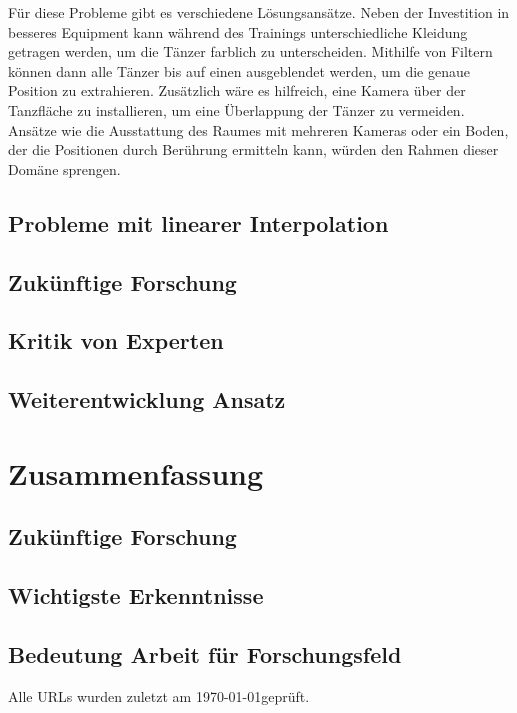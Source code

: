 \documentclass[
  ngerman,
  a4paper,  %
  twoside,  %
  bibliography=totoc,
  headsepline,
  cleardoublepage=empty,
  parskip=half,
  draft=false
]{scrbook}
\begin{document}
Für diese Probleme gibt es verschiedene Lösungsansätze. Neben der Investition in besseres Equipment kann während des Trainings unterschiedliche Kleidung getragen werden, um die Tänzer farblich zu unterscheiden. Mithilfe von Filtern können dann alle Tänzer bis auf einen ausgeblendet werden, um die genaue Position zu extrahieren. Zusätzlich wäre es hilfreich, eine Kamera über der Tanzfläche zu installieren, um eine Überlappung der Tänzer zu vermeiden. Ansätze wie die Ausstattung des Raumes mit mehreren Kameras oder ein Boden, der die Positionen durch Berührung ermitteln kann, würden den Rahmen dieser Domäne sprengen.

\section{Probleme mit linearer Interpolation}
\section{Zukünftige Forschung}
\section{Kritik von Experten}
\section{Weiterentwicklung Ansatz}

\chapter{Zusammenfassung}
\section{Zukünftige Forschung}
\section{Wichtigste Erkenntnisse}
\section{Bedeutung Arbeit für Forschungsfeld}

\printbibliography

Alle URLs wurden zuletzt am \today \space geprüft.

\appendix


\pagestyle{empty}
\renewcommand*{\chapterpagestyle}{empty}
\Versicherung
\end{document}
